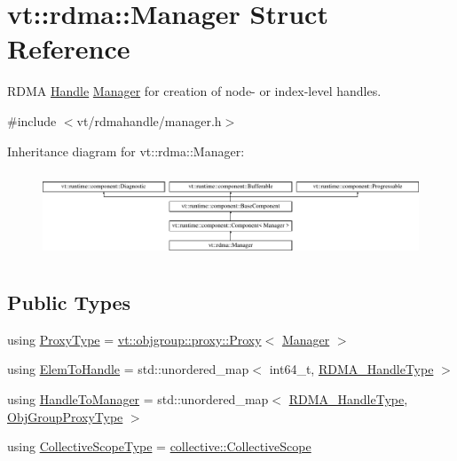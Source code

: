 \hypertarget{structvt_1_1rdma_1_1_manager}{}\section{vt\+:\+:rdma\+:\+:Manager Struct Reference}
\label{structvt_1_1rdma_1_1_manager}


R\+D\+MA \hyperlink{structvt_1_1rdma_1_1_handle}{Handle} \hyperlink{structvt_1_1rdma_1_1_manager}{Manager} for creation of node-\/ or index-\/level handles.  




{\ttfamily \#include $<$vt/rdmahandle/manager.\+h$>$}

Inheritance diagram for vt\+:\+:rdma\+:\+:Manager\+:\begin{figure}[H]
\begin{center}
\leavevmode
\includegraphics[height=2.592592cm]{structvt_1_1rdma_1_1_manager}
\end{center}
\end{figure}
\subsection*{Public Types}
\begin{DoxyCompactItemize}
\item 
using \hyperlink{structvt_1_1rdma_1_1_manager_a75d5cdc6428ea19f5ec665b04dcd7166}{Proxy\+Type} = \hyperlink{structvt_1_1objgroup_1_1proxy_1_1_proxy}{vt\+::objgroup\+::proxy\+::\+Proxy}$<$ \hyperlink{structvt_1_1rdma_1_1_manager}{Manager} $>$
\item 
using \hyperlink{structvt_1_1rdma_1_1_manager_ad794893058cec7595bc2bcb466ce7d3f}{Elem\+To\+Handle} = std\+::unordered\+\_\+map$<$ int64\+\_\+t, \hyperlink{namespacevt_a10442579ec4e7ebef223818e64bcf908}{R\+D\+M\+A\+\_\+\+Handle\+Type} $>$
\item 
using \hyperlink{structvt_1_1rdma_1_1_manager_aac6e7c58d320c302ea08461941d65f6e}{Handle\+To\+Manager} = std\+::unordered\+\_\+map$<$ \hyperlink{namespacevt_a10442579ec4e7ebef223818e64bcf908}{R\+D\+M\+A\+\_\+\+Handle\+Type}, \hyperlink{namespacevt_ad7cae989df485fccca57f0792a880a8e}{Obj\+Group\+Proxy\+Type} $>$
\item 
using \hyperlink{structvt_1_1rdma_1_1_manager_a7a5509b81547110f71aa85027520cfd5}{Collective\+Scope\+Type} = \hyperlink{structvt_1_1collective_1_1_collective_scope}{collective\+::\+Collective\+Scope}
\end{DoxyCompactItemize}
